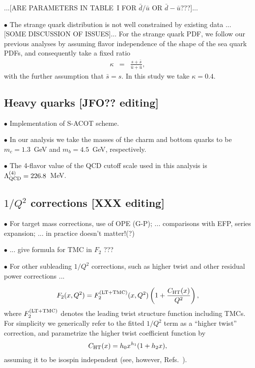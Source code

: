 \documentclass[aps,prd,amsmath,preprint]{revtex4}
\begin{document}
{\color{red} ...[ARE PARAMETERS IN TABLE~I FOR $\bar d / \bar u$
OR $\bar d - \bar u$???]...}




$\bullet$
The strange quark distribution is not well constrained by existing
data ...[SOME DISCUSSION OF ISSUES]...
%
For the strange quark PDF, we follow our previous analyses
\cite{CJ11, CJ12} by assuming flavor independence of the shape
of the sea quark PDFs, and consequently take a fixed ratio
%
\begin{eqnarray}
\kappa
&=& \frac{s + \bar s}{\bar u + \bar u},
\label{eq:kappa}
\end{eqnarray}
%
with the further assumption that $\bar s = s$.
In this study we take $\kappa = 0.4$.


\subsection{Heavy quarks {\color{red} [JFO?? editing]}}
\label{ssec:HQs}

$\bullet$
Implementation of S-ACOT scheme.


$\bullet$
In our analysis we take the masses of the charm and bottom quarks
to be $m_c = 1.3$~GeV and $m_b = 4.5$~GeV, respectively.


$\bullet$
The 4-flavor value of the QCD cutoff scale used in this analysis is
$\Lambda_{\rm QCD}^{(4)} = 226.8$~MeV.


\subsection{$1/Q^2$ corrections {\color{red} [XXX editing]}}
\label{ssec:power}

$\bullet$
For target mass corrections, use of OPE (G-P);
... comparisons with EFP, series expansion;
... in practice doesn't matter!(?)


$\bullet$
... give formula for TMC in $F_2$ ???


$\bullet$
For other subleading $1/Q^2$ corrections, such as higher twist and
other residual power corrections ...


%
\begin{align}
F_2(x,Q^2)
= F_2^{(\rm LT+TMC)}(x,Q^2)
  \left( 1 + \frac{C_{\rm HT}(x)}{Q^2} \right),
\label{eq:F2ht}
\end{align}
%
where $F_2^{\rm (LT+TMC)}$ denotes the leading twist structure function
including TMCs.  For simplicity we generically refer to the fitted
$1/Q^2$ term as a ``higher twist'' correction, and parametrize the
higher twist coefficient function by
%
\begin{align}
C_{\rm HT}(x) = h_0 x^{h_1} (1+h_2 x),
\label{eq:C_ht}
\end{align}
%
assuming it to be isospin independent
(see, however, Refs.~\cite{Vir92, AKL03, BB08, Blu12}).
\end{document}

